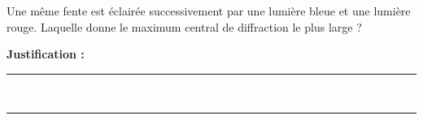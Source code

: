 Une même fente est éclairée successivement par une lumière bleue et une lumière rouge. Laquelle donne le maximum central de diffraction le plus large ?

\choices

\noindent\textbf{Justification :} \hrulefill \\[2.5ex]
\rule{\linewidth}{0.4pt} \\[2.5ex]
\rule{\linewidth}{0.4pt}
\vfill
